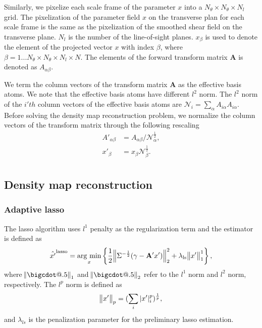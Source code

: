 \documentclass[twocolumn]{aastex62}
\makeatletter
\newcommand*\bigcdot{\mathpalette\bigcdot@{.5}}
\newcommand*\bigcdot@[2]{\mathbin{\vcenter{\hbox{\scalebox{#2}{$\m@th#1\bullet$}}}}}
\newcommand{\argmin}{\mathop{\rm arg~min}\limits}
\makeatother
\begin{document}
Similarly, we pixelize each scale frame of the parameter $x$ into a $N_\theta \times N_\theta \times N_l$ grid. 
The pixelization of the parameter field $x$ on the transverse plan for each scale frame is the same as the 
pixelization of the smoothed shear field on the transverse plane. $N_l$ is the number of the line-of-sight planes. 
$x_{\beta}$ is used to denote the element of the projected vector $x$ with index $\beta$, where $\beta=1...
N_\theta \times N_\theta \times N_l \times N$. The elements of the forward transform matrix $\mathbf{A}$ is denoted 
as $A_{\alpha\beta}$.

We term the column vectors of the transform matrix $\mathbf{A}$ as the effective basis atoms. We note that the effective 
basis atoms have different $l^2$ norm. The $l^2$ norm of the $i'th$ column vectors of the effective basis atoms are 
$\mathcal{N}_{i}=\sum_\alpha A_{i\alpha}A_{i\alpha}$. Before solving the density map reconstruction problem, we normalize 
the column
vectors of the transform matrix through the following rescaling
\begin{equation}
\begin{split}
A'_{\alpha\beta}&=A_{\alpha\beta}/\mathcal{N}_{\alpha}^{\frac{1}{2}},\\
x'_{\beta}&=x_{\beta}\mathcal{N}_{\beta}^{\frac{1}{2}}.\\
\end{split}
\end{equation}

\subsection{Density map reconstruction}
\label{subsec:method-reconstruction}

\subsubsection{Adaptive lasso}

The lasso algorithm uses $l^1$ penalty as the regularization term and the estimator is defined as
\begin{equation}
\hat{x'}^{\rm{lasso}}=\argmin_{x} \left\{ \frac{1}{2}\norm{\Sigma^{-\frac{1}{2}}(\gamma- \mathbf{A'} x')}_2^2+ \lambda_{\rm{ls}} \norm{x'}^1_1\right\},
\end{equation}
where $\norm{\bigcdot}_1$ and $\norm{\bigcdot}_2$ refer to the $l^1$ norm and $l^2$ norm, respectively. The $l^p$ norm is
defined as
\begin{equation}
\norm{x'}_p=(\sum_{i} |x'|^p_i)^{\frac{1}{p}},
\end{equation}
and $\lambda_{ls}$ is the penalization parameter for the preliminary lasso estimation.
\end{document}
